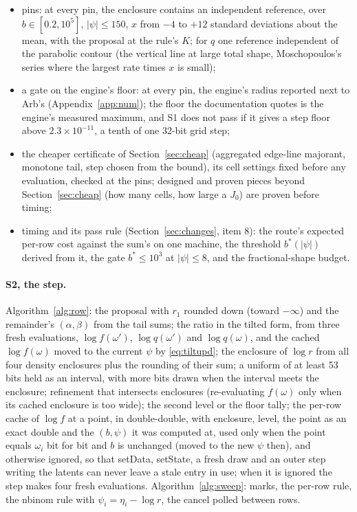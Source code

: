 \begin{itemize}
decision and the tally;
\item pins: at every pin, the enclosure contains an independent reference, over $b\in[0.2,10^5]$, $|\psi|\le150$,
$x$ from $-4$ to $+12$ standard deviations about the mean, with the proposal at the rule's $K$; for $q$ one
reference independent of the parabolic contour (the vertical line at large total shape, Moschopoulos's series where
the largest rate times $x$ is small);
\item a gate on the engine's floor: at every pin, the engine's radius reported next to Arb's
(Appendix~\ref{app:num}); the floor the documentation quotes is the engine's measured maximum, and S1 does not pass
if it gives a step floor above $2.3\times10^{-11}$, a tenth of one 32-bit grid step;
\item the cheaper certificate of Section~\ref{sec:cheap} (aggregated edge-line majorant, monotone tail, step chosen
from the bound), its cell settings fixed before any evaluation, checked at the pins; designed and proven pieces
beyond Section~\ref{sec:cheap} (how many cells, how large a $J_0$) are proven before timing;
\item timing and its pass rule (Section~\ref{sec:changes}, item 8): the route's expected per-row cost against the sum's
on one machine, the threshold $b^*(|\psi|)$ derived from it, the gate $b^*\le10^3$ at $|\psi|\le8$, and the
fractional-shape budget.
\end{itemize}

\paragraph{S2, the step.} Algorithm~\ref{alg:row}: the proposal with $r_1$ rounded down (toward $-\infty$) and the
remainder's $(\alpha,\beta)$ from the tail sums; the ratio in the tilted form, from three fresh evaluations,
$\log f(\omega')$, $\log q(\omega')$ and $\log q(\omega)$, and the cached $\log f(\omega)$ moved to the current
$\psi$ by \eqref{eq:tiltupd}; the enclosure of $\log r$ from all four density enclosures plus the rounding of their
sum; a uniform of at least 53 bits held as an interval, with more bits drawn when the interval meets the
enclosure; refinement that intersects enclosures (re-evaluating $f(\omega)$ only when its cached enclosure is too
wide); the second level or the floor tally; the per-row cache of $\log f$ at a point, in double-double, with
enclosure, level, the point as an exact double and the $(b,\psi)$ it was computed at, used only when the point
equals $\omega_i$ bit for bit and $b$ is unchanged (moved to the new $\psi$ then), and otherwise ignored, so that
setData, setState, a fresh draw and an outer step writing the latents can never leave a stale entry in use; when it
is ignored the step makes four fresh evaluations.
Algorithm~\ref{alg:sweep}: marks, the per-row rule, the nbinom rule with $\psi_i=\eta_i-\log r$, the cancel polled
between rows.

